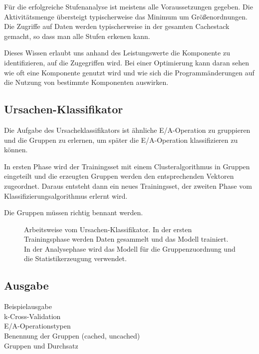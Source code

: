 Für die erfolgreiche Stufenanalyse ist meistens alle Voraussetzungen gegeben.
Die Aktivitätsmenge übersteigt typischerweise das Minimum um Größenordnungen.
Die Zugriffe auf Daten werden typischerweise in der gesamten Cachestack gemacht, so dass man alle Stufen erkenen kann.

Dieses Wissen erlaubt uns anhand des Leistungswerte die Komponente zu identifizieren, auf die Zugegriffen wird.
Bei einer Optimierung kann daran sehen wie oft eine Komponente genutzt wird und wie sich die Programmänderungen auf die Nutzung von bestimmte Komponenten auswirken.




\subsection{Ursachen-Klassifikator}
Die Aufgabe des Ursacheklassifikators ist ähnliche E/A-Operation zu gruppieren und die Gruppen zu erlernen, um später die E/A-Operation klassifizieren zu können.

In ersten Phase wird der Trainingsset mit einem Clusteralgorithmus in Gruppen eingeteilt und die erzeugten Gruppen werden den entsprechenden Vektoren zugeordnet.
Daraus entsteht dann ein neues Trainingsset, der zweiten Phase vom Klassifizierungsalgorithmus erlernt wird.

Die Gruppen müssen richtig bennant werden.
                                                                                                                                                                                          


\begin{figure}[h]
	\hfill
	\subfigure[Training]{
		
		\label{fig:des:class_training}
	}
	\hfill
	\subfigure[Vorhersage]{
		
		\label{fig:des:class_prediction}
	}
	\hfill
	\label{fig:des:class_phases}
	\caption{Arbeitsweise vom Ursachen-Klassifikator. In der ersten Trainingsphase werden Daten gesammelt und das Modell trainiert. In der Analysephase wird das Modell für die Gruppenzuordnung und die Statistikerzeugung verwendet.}
\end{figure}



\subsection{Ausgabe}
Beispielausgabe\\
k-Cross-Validation\\
E/A-Operationstypen\\
Benennung der Gruppen (cached, uncached)\\
Gruppen und Durchsatz



